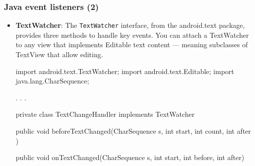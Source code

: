 \documentclass{report}
\begin{document}
    \subsubsection{Java event listeners (2)}
    \begin{itemize}
        \item \textbf{TextWatcher}: The \texttt{TextWatcher} interface, from the android.text package, provides three methods to handle key events.
            \bigbreak \noindent 
            You can attach a TextWatcher to any view that implements Editable text content — meaning subclasses of TextView that allow editing.
            \bigbreak \noindent 
            \begin{javacode}
                import android.text.TextWatcher;
                import android.text.Editable;
                import java.lang.CharSequence;

                .
                .
                .


                private class TextChangeHandler implements TextWatcher {
                    public void beforeTextChanged(CharSequence s, int start, int count, int after )

                    public void onTextChanged(CharSequence s, int start, int before, int after)

}
\end{javacode}
\end{itemize}
\end{document}
